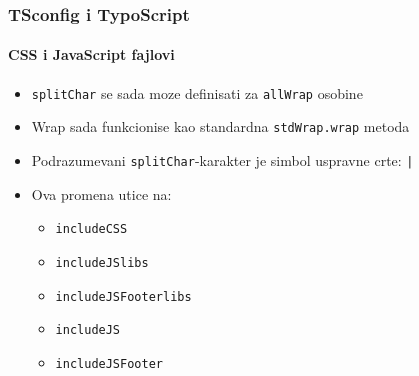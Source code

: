 \begin{frame}[fragile]
	\frametitle{TSconfig i TypoScript}
	\framesubtitle{CSS i JavaScript fajlovi}

	\begin{itemize}
		\item \texttt{splitChar} se sada moze definisati za \texttt{allWrap} osobine
		\item Wrap sada funkcionise kao standardna \texttt{stdWrap.wrap} metoda
		\item Podrazumevani \texttt{splitChar}-karakter je simbol uspravne crte: \texttt{|}
		\item Ova promena utice na:

			\begin{itemize}
				\item \texttt{includeCSS}
				\item \texttt{includeJSlibs}
				\item \texttt{includeJSFooterlibs}
				\item \texttt{includeJS}
				\item \texttt{includeJSFooter}
			\end{itemize}

	\end{itemize}

\end{frame}


